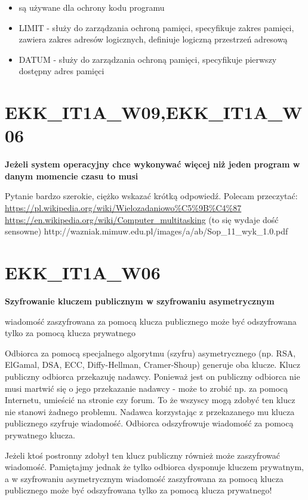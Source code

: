 \vspace{0.4cm}

\begin{itemize}
	\item są używane dla ochrony kodu programu
	\item LIMIT - służy do zarządzania ochroną pamięci, specyfikuje zakres pamięci, zawiera zakres adresów logicznych, definiuje logiczną przestrzeń adresową
	\item DATUM - służy do zarządzania ochroną pamięci, specyfikuje pierwszy dostępny adres pamięci
\end{itemize}


\section{EKK\_IT1A\_W09,EKK\_IT1A\_W06}
\textbf{Jeżeli system operacyjny chce wykonywać więcej niż jeden program w danym momencie czasu to musi}

\vspace{0.4cm}

Pytanie bardzo szerokie, ciężko wskazać krótką odpowiedź. Polecam przeczytać:
\url{https://pl.wikipedia.org/wiki/Wielozadaniowo%C5%9B%C4%87}
\url{https://en.wikipedia.org/wiki/Computer\_multitasking} (to się wydaje dość sensowne)
http://wazniak.mimuw.edu.pl/images/a/ab/Sop\_11\_wyk\_1.0.pdf 


\section{EKK\_IT1A\_W06}
\textbf{Szyfrowanie kluczem publicznym w szyfrowaniu asymetrycznym}

\vspace{0.4cm}
wiadomość zaszyfrowana za pomocą klucza publicznego może być odszyfrowana tylko za pomocą klucza prywatnego

Odbiorca za pomocą specjalnego algorytmu (szyfru) asymetrycznego (np. RSA, ElGamal, DSA, ECC, Diffy-Hellman, Cramer-Shoup) generuje oba klucze. Klucz publiczny odbiorca przekazuję nadawcy. Ponieważ jest on publiczny odbiorca nie musi martwić się o jego przekazanie nadawcy - może to zrobić np. za pomocą Internetu, umieścić na stronie czy forum. To że wszyscy mogą zdobyć ten klucz nie stanowi żadnego problemu.
Nadawca korzystając z przekazanego mu klucza publicznego szyfruje wiadomość.
Odbiorca odszyfrowuje wiadomość za pomocą prywatnego klucza.

Jeżeli ktoś postronny zdobył ten klucz publiczny również może zaszyfrować wiadomość. Pamiętajmy jednak że tylko odbiorca dysponuje kluczem prywatnym, a w szyfrowaniu asymetrycznym wiadomość zaszyfrowana za pomocą klucza publicznego może być odszyfrowana tylko za pomocą klucza prywatnego! 

